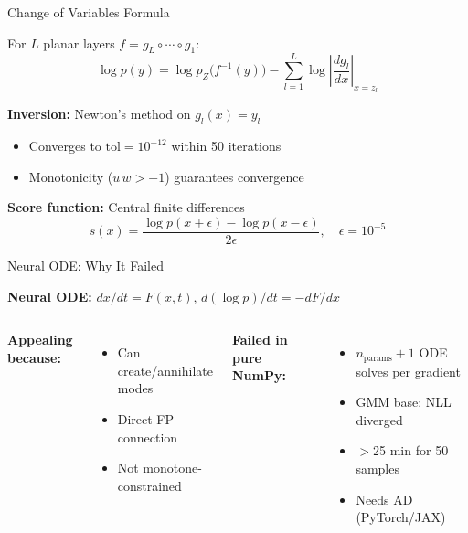 \documentclass[aspectratio=169,11pt]{beamer}
\begin{document}

\begin{frame}{Change of Variables Formula}

For $L$ planar layers $f = g_L \circ \cdots \circ g_1$:
\begin{equation*}
    \log p(y) = \log p_Z\!\big(f^{-1}(y)\big) - \sum_{l=1}^{L} \log\left|\frac{dg_l}{dx}\right|_{x=z_l}
\end{equation*}

\textbf{Inversion:} Newton's method on $g_l(x) = y_l$
\begin{itemize}
    \item Converges to $\mathrm{tol} = 10^{-12}$ within 50 iterations
    \item Monotonicity ($u\,w > -1$) guarantees convergence
\end{itemize}

\textbf{Score function:} Central finite differences
\begin{equation*}
    s(x) = \frac{\log p(x+\epsilon) - \log p(x-\epsilon)}{2\epsilon}, \quad \epsilon = 10^{-5}
\end{equation*}

\end{frame}


\begin{frame}{Neural ODE: Why It Failed}

\textbf{Neural ODE:} $dx/dt = F(x,t)$, $d(\log p)/dt = -dF/dx$

\smallskip
\begin{columns}[T]
\textbf{Appealing because:}
\begin{itemize}
    \item Can create/annihilate modes
    \item Direct FP connection
    \item Not monotone-constrained
\end{itemize}

\textbf{Failed in pure NumPy:}
\begin{itemize}
    \item $n_{\mathrm{params}}+1$ ODE solves per gradient
    \item GMM base: NLL diverged
    \item $>$25 min for 50 samples
    \item Needs AD (PyTorch/JAX)
\end{itemize}
\end{columns}

\end{frame}
\end{document}

